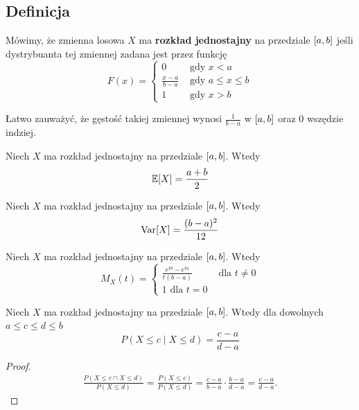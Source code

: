 \subsection{Definicja}
\begin{definition}
    Mówimy, że zmienna losowa \( X \) ma \textbf{rozkład jednostajny} na przedziale \( \left[a, b\right] \) jeśli dystrybuanta tej zmiennej zadana jest przez funkcję
    \[
        F(x) = \begin{cases}
            0 & \text{ gdy } x < a \\
            \frac{x - a}{b - a} & \text{ gdy } a \leq x \leq b \\
            1 & \text{ gdy } x > b
        \end{cases}
    \]
\end{definition}
Łatwo zauważyć, że gęstość takiej zmiennej wynosi \( \frac{1}{b-a} \) w \( \left[a, b\right] \) oraz 0 wszędzie indziej.

\begin{theorem}
    Niech \( X \) ma rozkład jednostajny na przedziale \( \left[a, b\right] \). Wtedy
    \[
        \expected{X} = \frac{a + b}{2}
    \]
\end{theorem}

\begin{theorem}
    Niech \( X \) ma rozkład jednostajny na przedziale \( \left[a, b\right] \). Wtedy
    \[
        \variance{X} = \frac{(b-a)^2}{12}
    \]
\end{theorem}


\begin{theorem}
    Niech \( X \) ma rozkład jednostajny na przedziale \( \left[a, b\right] \). Wtedy
    \[
        M_X(t) = \begin{cases}
            \frac{e^{tb} - e^{ta}}{t(b-a)} & \text{ dla } t \neq 0 \\
            1 \text{ dla } t = 0
        \end{cases}
    \]
\end{theorem}

\begin{theorem}
    Niech \( X \) ma rozkład jednostajny na przedziale \( \left[a, b\right] \). Wtedy dla dowolnych \( a \leq c \leq d \leq b \)
    \[
        P(X \leq c \mid X \leq d) = \frac{c - a}{d - a}
    \]
\end{theorem}
\begin{proof}
    \begin{align*}
        \frac{P\left( X\le c \cap X\le d  \right) }{P\left( X\le d  \right) } = \frac{P\left( X\le c  \right) }{P\left( X\le d  \right) } = \frac{c-a}{b-a} \cdot \frac{b-a}{d-a} = \frac{c-a}{d-a}.
    \end{align*}
\end{proof}


